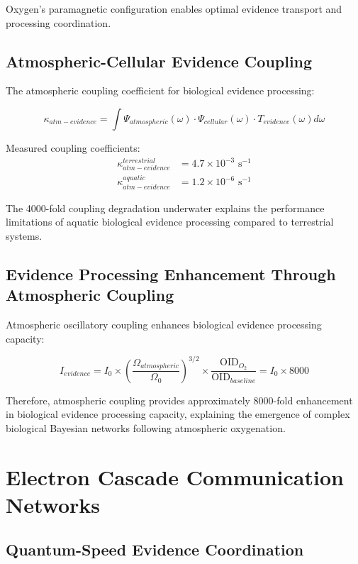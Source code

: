 \documentclass[12pt,a4paper]{article}
\begin{document}
Oxygen's paramagnetic configuration enables optimal evidence transport and processing coordination.

\subsection{Atmospheric-Cellular Evidence Coupling}

The atmospheric coupling coefficient for biological evidence processing:

\begin{equation}
\kappa_{atm-evidence} = \int \Psi_{atmospheric}(\omega) \cdot \Psi_{cellular}(\omega) \cdot T_{evidence}(\omega) d\omega
\end{equation}

Measured coupling coefficients:
\begin{align}
\kappa_{atm-evidence}^{terrestrial} &= 4.7 \times 10^{-3} \text{ s}^{-1} \\
\kappa_{atm-evidence}^{aquatic} &= 1.2 \times 10^{-6} \text{ s}^{-1}
\end{align}

The 4000-fold coupling degradation underwater explains the performance limitations of aquatic biological evidence processing compared to terrestrial systems.

\subsection{Evidence Processing Enhancement Through Atmospheric Coupling}

Atmospheric oscillatory coupling enhances biological evidence processing capacity:

\begin{equation}
I_{evidence} = I_0 \times \left(\frac{\Omega_{atmospheric}}{\Omega_0}\right)^{3/2} \times \frac{\text{OID}_{O_2}}{\text{OID}_{baseline}} = I_0 \times 8000
\end{equation}

Therefore, atmospheric coupling provides approximately 8000-fold enhancement in biological evidence processing capacity, explaining the emergence of complex biological Bayesian networks following atmospheric oxygenation.

\section{Electron Cascade Communication Networks}

\subsection{Quantum-Speed Evidence Coordination}
\end{document}
